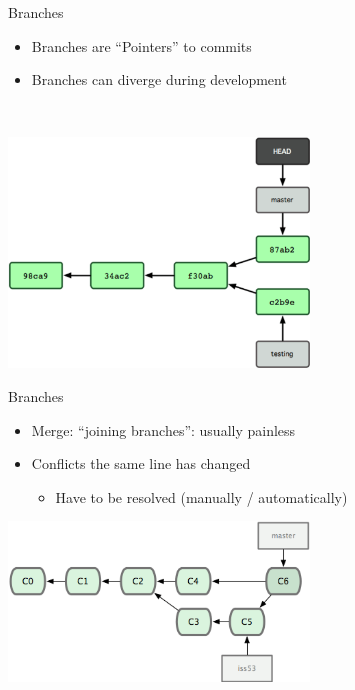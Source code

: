 \documentclass[10pt,xcolor=dvipsnames]{beamer}
\begin{document}
\begin{frame}{Branches}
\begin{itemize}
\item Branches are ``Pointers'' to commits
\item Branches can diverge during development
\end{itemize}
~\\[0.1in]
\begin{center}
\includegraphics[width = 0.6\textwidth]{branch2.png}
\end{center}
\end{frame}

\begin{frame}{Branches}
\begin{center}
\begin{itemize}
\item Merge: ``joining branches'': usually painless
\item Conflicts the same line has changed 
\begin{itemize}
\item Have to be resolved (manually / automatically)
\end{itemize}
\end{itemize}
\includegraphics[width = 0.6\textwidth]{branchmerge.png}
\end{center}
\end{frame}
\end{document}

